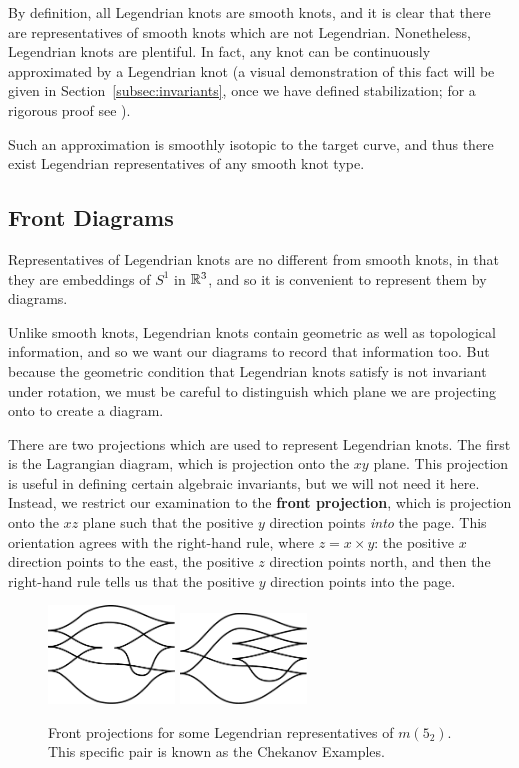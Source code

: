 By definition, all Legendrian knots are smooth knots, and it is clear that there are representatives of smooth knots which are not Legendrian. Nonetheless, Legendrian knots are plentiful. In fact, any knot can be continuously approximated by a Legendrian knot (a visual demonstration of this fact will be given in Section~\ref{subsec:invariants}, once we have defined stabilization; for a rigorous proof see \cite{geiges}).

Such an approximation is smoothly isotopic to the target curve, and thus there exist Legendrian representatives of any smooth knot type.

\subsection{Front Diagrams}

Representatives of Legendrian knots are no different from smooth knots, in that they are embeddings of $S^1$ in $\mathbb{R}^3$, and so it is convenient to represent them by diagrams.

Unlike smooth knots, Legendrian knots contain geometric as well as topological information, and so we want our diagrams to record that information too. But because the geometric condition that Legendrian knots satisfy is not invariant under rotation, we must be careful to distinguish which plane we are projecting onto to create a diagram.

There are two projections which are used to represent Legendrian knots. The first is the Lagrangian diagram, which is projection onto the $xy$ plane. This projection is useful in defining certain algebraic invariants, but we will not need it here.
Instead, we restrict our examination to the \textbf{front projection}, which is projection onto the $xz$ plane such that the positive $y$ direction points \emph{into} the page. This orientation agrees with the right-hand rule, where $z = x \times y$: the positive $x$ direction points to the east, the positive $z$ direction points north, and then the right-hand rule tells us that the positive $y$ direction points into the page.

\begin{figure}[ht]
    \centering
    \includegraphics[width=0.3\textwidth]{images/chekanov-1.pdf}
    \hspace{2em}
    \includegraphics[width=0.3\textwidth]{images/chekanov-2.pdf}
    \caption{Front projections for some Legendrian representatives of $m(5_2)$. This specific pair is known as the Chekanov Examples.}%
    \label{fig:front-projection}
\end{figure}

